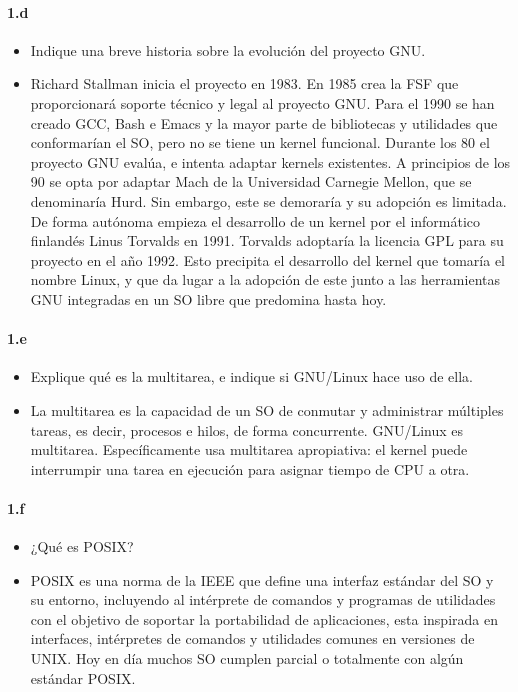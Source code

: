 \documentclass[10pt,a4paper]{paper}
\begin{document}
	
	\paragraph{1.d}
	
	\begin{itemize}
		\item Indique una breve historia sobre la evolución del proyecto GNU.
		
		\item Richard Stallman inicia el proyecto en 1983. En 1985 crea la FSF que
		proporcionará soporte técnico y legal al proyecto GNU. Para el 1990 se han
		creado GCC, Bash e Emacs y la mayor parte de bibliotecas y utilidades que
		conformarían el SO, pero no se tiene un kernel funcional. Durante los 80 el
		proyecto GNU evalúa, e intenta adaptar kernels existentes. A principios de los
		90 se opta por adaptar Mach de la Universidad Carnegie Mellon, que se
		denominaría Hurd. Sin embargo, este se demoraría y su adopción es limitada. De
		forma autónoma empieza el desarrollo de un kernel por el informático finlandés
		Linus Torvalds en 1991. Torvalds adoptaría la licencia GPL para su proyecto en
		el año 1992. Esto precipita el desarrollo del kernel que tomaría el nombre
		Linux, y que da lugar a la adopción de este junto a las herramientas GNU
		integradas en un SO libre que predomina hasta hoy.
	\end{itemize}
	
	
	\paragraph{1.e}
	
	\begin{itemize}
		\item Explique qué es la multitarea, e indique si GNU/Linux hace uso de ella.
		
		\item La multitarea es la capacidad de un SO de conmutar y administrar
		múltiples tareas, es decir, procesos e hilos, de forma concurrente. GNU/Linux es
		multitarea. Específicamente usa multitarea apropiativa: el kernel puede
		interrumpir una tarea en ejecución para asignar tiempo de CPU a otra.
	\end{itemize}
	
	\paragraph{1.f}
	
	\begin{itemize}
		\item ¿Qué es POSIX?
		
		\item POSIX es una norma de la IEEE que define una interfaz estándar del SO y
		su entorno, incluyendo al intérprete de comandos y programas de utilidades con
		el objetivo de soportar la portabilidad de aplicaciones, esta inspirada en
		interfaces, intérpretes de comandos y utilidades comunes en versiones de UNIX.
		Hoy en día muchos SO cumplen parcial o totalmente con algún estándar POSIX.
	\end{itemize}
	
\end{document}
